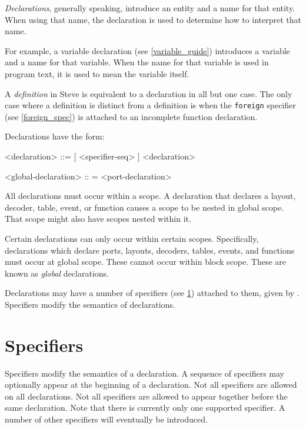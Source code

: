 \textit{Declarations}, generally speaking, introduce an entity and a name for that entity. When using that name, the declaration is used to determine how to interpret that name.

For example, a variable declaration (see \ref{variable_guide}) introduces a variable and a name for that variable. When the name for that variable is used in program text, it is used to mean the variable itself.

A \textit{definition} in Steve is equivalent to a declaration in all but one case. The only case where a definition is distinct from a definition is when the \texttt{foreign} specifier (see \ref{foreign_spec}) is attached to an incomplete function declaration.

Declarations have the form:

\begin{minip}
\begin{grammar}
<declaration> ::=
[ <specifier-seq> ] <declaration>

<global-declaration> :: =
<port-declaration>
\end{grammar}
\end{minip}

All declarations must occur within a scope. A declaration that declares a layout, decoder, table, event, or function causes a scope to be nested in global scope. That scope might also have scopes nested within it.

Certain declarations can only occur within certain scopes. Specifically, declarations which declare ports, layouts, decoders, tables, events, and functions must occur at global scope. These cannot occur within block scope. These are known as \textit{global} declarations.

Declarations may have a number of specifiers (see \ref{spec_guide}) attached to them, given by . Specifiers modify the semantics of declarations.

\section{Specifiers} \label{spec_guide}

Specifiers modify the semantics of a declaration. A sequence of specifiers may optionally appear at the beginning of a declaration. Not all specifiers are allowed on all declarations. Not all specifiers are allowed to appear together before the same declaration. Note that there is currently only one supported specifier. A number of other specifiers will eventually be introduced.


